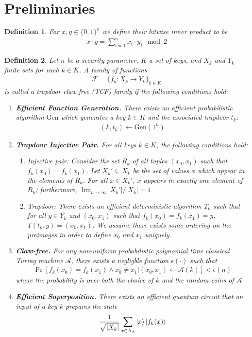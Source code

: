 \documentclass{article}
\newtheorem{definition}{Definition}
\begin{document}
\section{Preliminaries}
\begin{definition}
For $x,y\in\{0,1\}^{n}$ we define their bitwise inner product to be
\begin{align*}x\cdot y = \sum_{i=1}^{n}{x_{i}\cdot y_{i}} \mod 2\end{align*} 

\end{definition}
\begin{definition}
Let $n$ be a security parameter, $K$ a set of keys, and $X_{k}$ and $Y_{k}$ finite sets for each $k\in K$. A family of functions 
\begin{align*}\mathcal{F}=\{f_{k}:X_{k}\to Y_{k}\}_{k\in K}\end{align*} 
is called a trapdoor claw free (TCF) family if the following conditions hold:
\begin{enumerate}
    \item \textbf{Efficient Function Generation.} There exists an efficient probabilistic algorithm $\mathrm{Gen}$ which generates a key $k\in K$ and the associated trapdoor $t_{k}$:
    \begin{align*}(k,t_{k})\leftarrow \mathrm{Gen}(1^{n})\end{align*} 
    \item \textbf{Trapdoor Injective Pair.} For all keys $k\in K$, the following conditions hold:
    \begin{enumerate}
        \item Injective pair: Consider the set $R_{k}$ of all tuples $(x_{0}, x_{1})$ such that $f_{k}(x_{0})=f_{k}(x_{1})$. Let $X_{k}'\subseteq X_{k}$ be the set of values $x$ which appear in the elements of $R_{k}$. For all $x \in X_{k}'$, $x$ appears in exactly one element of $R_{k}$; furthermore, $\lim_{n\to \infty}{|X_{k}'|/|X_{k}|=1}$
        \item Trapdoor: There exists an efficient deterministic algorithm $T_{k}$ such that for all $y\in Y_{k}$ and $(x_{0},x_{1})$ such that $f_{k}(x_{0})=f_{k}(x_{1})=y$, $T(t_{k},y)=(x_{0},x_{1})$. We assume there exists some ordering on the preimages in order to define $x_{0}$ and $x_{1}$ uniquely.
    \end{enumerate}
    \item \textbf{Claw-free.} For any non-uniform probabilistic polynomial time classical Turing machine $\mathcal{A}$, there exists a negligble function $\epsilon(\cdot)$ such that
    \begin{align*}\Pr[f_{k}(x_{0})=f_{k}(x_{1})\wedge x_{0}\neq x_{1} | (x_{0},x_{1})\leftarrow \mathcal{A}(k)]<\epsilon(n)\end{align*}  where the probability is over both the choice of $k$ and the random coins of $\mathcal{A}$
    \item \textbf{Efficient Superposition.} There exists an efficient quantum circuit that on input of a key $k$ prepares the state
    \begin{align*}\frac{1}{\sqrt{|X_{k}|}}\sum_{x\in X_{k}}{\ket{x} \ket{f_{k}(x)}}\end{align*} 
\end{enumerate}
\end{definition}
\end{document}
